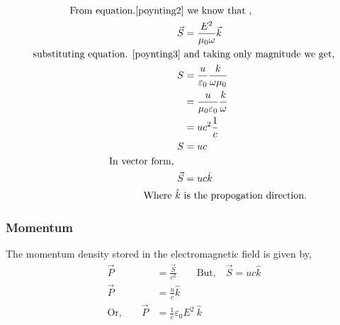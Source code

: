 \begin{align}
\text{From equation.\ref{poynting2}}&\text{ we know that ,}\\
\vec{S}&=\frac{E^{2}}{\mu_{0} \omega} \vec{k}\\
\text{substituting equation. \ref{poynting3} }&\text{and taking only magnitude we get,}\\
S&=\frac{u}{\varepsilon_{0}}\frac{k}{\omega \mu_{0}}\\
&=\frac{u}{\mu_{0} \varepsilon_{0}}\frac{k}{\omega }\\
&={u c^{2}}\frac{1}{c }\\
S&=uc\\
\text{{In vector form,}}\quad\\
\vec{S}&=uc \hat{k} \\
\text{Where $\hat{k}$ }&\text{is the propogation direction.}
\end{align}

\hspace{5.10cm}

\subsubsection{Momentum}
The momentum density stored in the electromagnetic field is given by,\\
\begin{align*}
\vec{P}&=\frac{\vec{S}}{c^{2}} \qquad \text{But,}\quad \vec{S}=uc \hat{k}\\
\vec{P}&=\frac{u}{c}\hat{k}\\
\text{Or,}\qquad \vec{P} &=\frac{1}{c} \varepsilon_{0} {E}^{2} \ \hat{k}
\end{align*}

